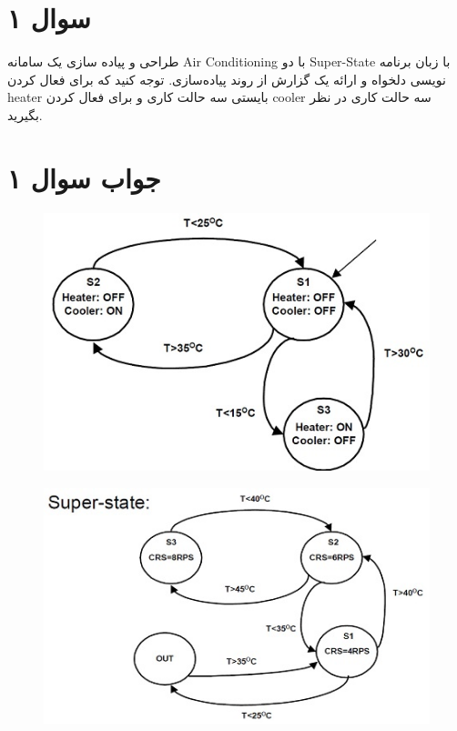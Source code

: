 \section*{سوال ۱}

طراحی و پیاده سازی یک سامانه Air Conditioning با دو Super-State با زبان برنامه نویسی دلخواه و ارائه یک گزارش از روند پیاده‌سازی. توجه کنید که برای فعال کردن heater بایستی سه حالت کاری و برای فعال کردن cooler سه حالت کاری در نظر بگیرید.

\section*{جواب سوال ۱}

\begin{figure}[h]
	\centering
	\includegraphics{6.jpg}
	\label{fig:label4}
\end{figure}

\begin{figure}[h]
	\centering
	\includegraphics{7.jpg}

	\label{fig:label4}
\end{figure}

